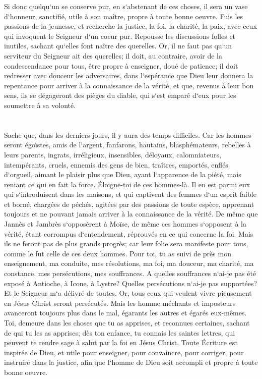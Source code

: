 \verse Si donc quelqu`un se conserve pur, en s`abstenant de ces choses, il sera un vase d`honneur, sanctifié, utile à son maître, propre à toute bonne oeuvre. 
\verse Fuis les passions de la jeunesse, et recherche la justice, la foi, la charité, la paix, avec ceux qui invoquent le Seigneur d`un coeur pur. 
\verse Repousse les discussions folles et inutiles, sachant qu`elles font naître des querelles. 
\verse Or, il ne faut pas qu`un serviteur du Seigneur ait des querelles; il doit, au contraire, avoir de la condescendance pour tous, être propre à enseigner, doué de patience; 
\verse il doit redresser avec douceur les adversaires, dans l`espérance que Dieu leur donnera la repentance pour arriver à la connaissance de la vérité, 
\verse et que, revenus à leur bon sens, ils se dégageront des pièges du diable, qui s`est emparé d`eux pour les soumettre à sa volonté. 

\chapter{}

\verse Sache que, dans les derniers jours, il y aura des temps difficiles. 
\verse Car les hommes seront égoïstes, amis de l`argent, fanfarons, hautains, blasphémateurs, rebelles à leurs parents, ingrats, irréligieux, 
\verse insensibles, déloyaux, calomniateurs, intempérants, cruels, ennemis des gens de bien, 
\verse traîtres, emportés, enflés d`orgueil, aimant le plaisir plus que Dieu, 
\verse ayant l`apparence de la piété, mais reniant ce qui en fait la force. Éloigne-toi de ces hommes-là. 
\verse Il en est parmi eux qui s`introduisent dans les maisons, et qui captivent des femmes d`un esprit faible et borné, chargées de péchés, agitées par des passions de toute espèce, 
\verse apprenant toujours et ne pouvant jamais arriver à la connaissance de la vérité. 
\verse De même que Jannès et Jambrès s`opposèrent à Moïse, de même ces hommes s`opposent à la vérité, étant corrompus d`entendement, réprouvés en ce qui concerne la foi. 
\verse Mais ils ne feront pas de plus grands progrès; car leur folie sera manifeste pour tous, comme le fut celle de ces deux hommes. 
\verse Pour toi, tu as suivi de près mon enseignement, ma conduite, mes résolutions, ma foi, ma douceur, ma charité, ma constance, 
\verse mes persécutions, mes souffrances. A quelles souffrances n`ai-je pas été exposé à Antioche, à Icone, à Lystre? Quelles persécutions n`ai-je pas supportées? Et le Seigneur m`a délivré de toutes. 
\verse Or, tous ceux qui veulent vivre pieusement en Jésus Christ seront persécutés. 
\verse Mais les homme méchants et imposteurs avanceront toujours plus dans le mal, égarants les autres et égarés eux-mêmes. 
\verse Toi, demeure dans les choses que tu as apprises, et reconnues certaines, sachant de qui tu les as apprises; 
\verse dès ton enfance, tu connais les saintes lettres, qui peuvent te rendre sage à salut par la foi en Jésus Christ. 
\verse Toute Écriture est inspirée de Dieu, et utile pour enseigner, pour convaincre, pour corriger, pour instruire dans la justice, 
\verse afin que l`homme de Dieu soit accompli et propre à toute bonne oeuvre. 

